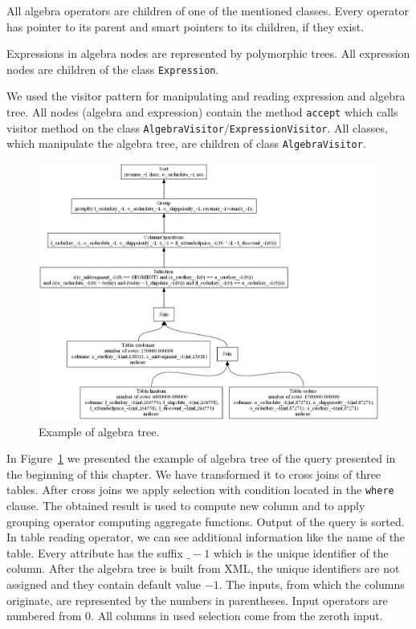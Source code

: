 All algebra operators are children of one of the mentioned classes. Every operator has pointer to its parent and smart pointers to its children, if they exist. 

Expressions in algebra nodes are represented by polymorphic trees. All expression nodes are children of the class \texttt{Expression}.

We used the visitor pattern for manipulating and reading expression and algebra tree. All nodes (algebra and expression) contain the method \texttt{accept} which calls visitor method on the class \texttt{AlgebraVisitor}/\texttt{ExpressionVisitor}. All classes, which manipulate the algebra tree, are children of class \texttt{AlgebraVisitor}.


\begin{figure}[h!]
  \centering
    \includegraphics[width=1.0\textwidth]{algebratree1}

      \caption{Example of algebra tree.}
          \label{fig:algebratree1}
\end{figure}

In Figure~\ref{fig:algebratree1} we presented the example of algebra tree of the query presented in the beginning of this chapter. We have transformed it to cross joins of three tables. After cross joins we apply selection with condition located in the \verb|where| clause. The obtained result is used to compute new column and to apply grouping operator computing aggregate functions. Output of the query is sorted. In table reading operator, we can see additional information like the name of the table. Every attribute has the suffix $\_-1$ which is the unique identifier of the column. After the algebra tree is built from XML, the unique identifiers are not assigned and they contain default value $-1$. The inputs, from which the columns originate, are represented by the numbers in parentheses. Input operators are numbered from $0$. All columns in used selection come from the zeroth input.

